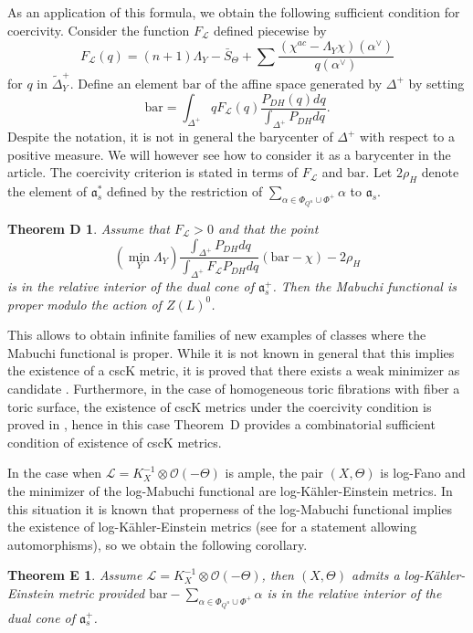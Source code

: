 \documentclass{amsart}
\newtheorem*{thmd}{Theorem D}
\newtheorem*{thme}{Theorem E}
\theoremstyle{definition}
\begin{document}
As an application of this formula, we obtain the following sufficient condition for 
coercivity.
Consider the function $F_{\mathcal{L}}$ defined piecewise by 
\[
F_{\mathcal{L}}(q)=(n+1)\Lambda_Y-\bar{S}_{\Theta}
+\sum\frac{(\chi^{ac}-\Lambda_Y\chi)(\alpha^{\vee})}{q(\alpha^{\vee})}
\]
for $q$ in $\tilde\Delta_Y^+$. 
Define an element $\mathrm{bar}$ of the affine space generated by 
$\Delta^+$ by setting 
\[
\mathrm{bar}=
\int_{\Delta^+} qF_{\mathcal{L}}(q)\frac{P_{DH}(q)dq}{\int_{\Delta^+}P_{DH}dq}.
\]
Despite the notation, it is not in general the barycenter of $\Delta^+$ 
with respect to a positive measure. We will however see how to consider 
it as a barycenter in the article. 
The coercivity criterion is stated in terms of $F_{\mathcal{L}}$ and 
$\mathrm{bar}$. 
Let $2\rho_H$ denote the element of $\mathfrak{a}_s^*$ defined by the 
restriction of $\sum_{\alpha\in \Phi_{Q^u}\cup\Phi^+}\alpha$ to $\mathfrak{a}_s$.

\begin{thmd}
Assume that $F_{\mathcal{L}} >0$ and that the point 
\[
(\min_Y \Lambda_Y)\frac{\int_{\Delta^+}P_{DH}dq}{\int_{\Delta^+}F_{\mathcal{L}}P_{DH}dq}(\mathrm{bar}-\chi)-2\rho_H
\] 
is in the relative interior of the dual cone of $\mathfrak{a}_s^+$.
Then the Mabuchi functional is proper modulo the action of 
$Z(L)^0$.
\end{thmd}

This allows to obtain infinite families of new examples of classes 
where the Mabuchi functional is proper. While it is not known in 
general that this implies the existence of a cscK metric, it is 
proved that there exists a weak minimizer as candidate \cite{DR17}. 
Furthermore, in the case of homogeneous toric fibrations with 
fiber a toric surface, the existence of cscK metrics under 
the coercivity condition is proved in \cite{CHLLS}, hence 
in this case Theorem~D provides a combinatorial sufficient 
condition of existence of cscK metrics. 

In the case when $\mathcal{L}=K_X^{-1}\otimes \mathcal{O}(-\Theta)$ is ample, 
the pair $(X,\Theta)$ is log-Fano and the minimizer of the log-Mabuchi 
functional are log-Kähler-Einstein metrics. In this situation 
it is known that properness of the log-Mabuchi functional implies 
the existence of log-Kähler-Einstein metrics (see \cite{Dar17} for a 
statement allowing automorphisms), 
so we obtain the following corollary.

\begin{thme}
Assume $\mathcal{L}=K_X^{-1}\otimes \mathcal{O}(-\Theta)$, 
then $(X,\Theta)$ admits a log-Kähler-Einstein metric 
provided $\mathrm{bar}-\sum_{\alpha\in \Phi_{Q^u}\cup\Phi^+}\alpha$ 
is in the relative interior of the dual cone of $\mathfrak{a}_s^+$.
\end{thme}
\end{document}
